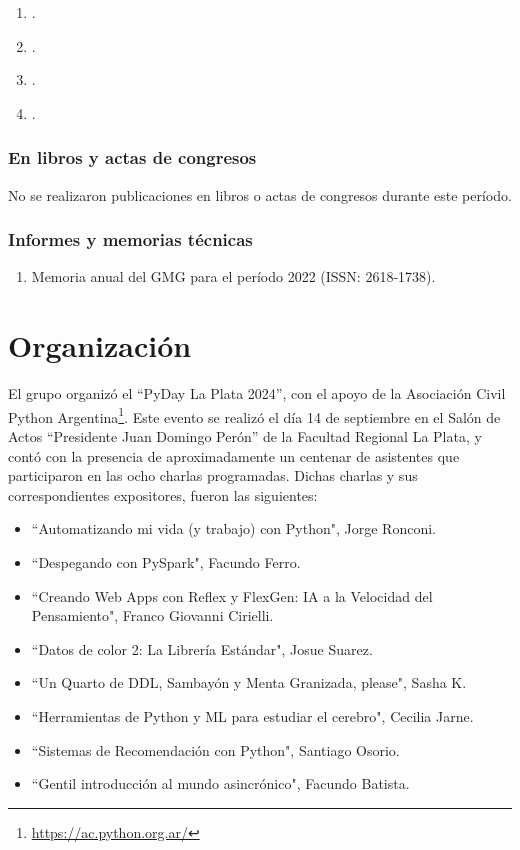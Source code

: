 \documentclass[a4paper,11pt,twoside,final,titlepage,onecolumn,openright]{report}
\begin{document}
\begin{enumerate}
    \item {}.
    \item {}.
    \item {}.
    \item {}.
\end{enumerate}

\subsubsection{En libros y actas de congresos}

No se realizaron publicaciones en libros o actas de congresos durante este período.

\subsubsection{Informes y memorias técnicas}
\begin{enumerate}
 \item Memoria anual del GMG para el período 2022 (ISSN: 2618-1738).
\end{enumerate}
\vspace{0.25cm}
\section{Organización}
\vspace{0.5cm}

El grupo organizó el ``PyDay La Plata 2024'', con el apoyo de la Asociación Civil Python Argentina\footnote{\url{https://ac.python.org.ar/}}. Este evento se realizó el día 14 de septiembre en el Salón de Actos ``Presidente Juan Domingo Perón'' de la Facultad Regional La Plata, y contó con la presencia de aproximadamente un centenar de asistentes que participaron en las ocho charlas programadas. Dichas charlas y sus correspondientes expositores, fueron las siguientes:
\begin{itemize}
\item ``Automatizando mi vida (y trabajo) con Python", Jorge Ronconi.
\item ``Despegando con PySpark", Facundo Ferro.
\item ``Creando Web Apps con Reflex y FlexGen: IA a la Velocidad del Pensamiento", Franco Giovanni Cirielli.
\item ``Datos de color 2: La Librería Estándar", Josue Suarez.
\item ``Un Quarto de DDL, Sambayón y Menta Granizada, please", Sasha K.
\item ``Herramientas de Python y ML para estudiar el cerebro", Cecilia Jarne.
\item ``Sistemas de Recomendación con Python", Santiago Osorio.
\item ``Gentil introducción al mundo asincrónico", Facundo Batista.
\end{itemize}
\end{document}
